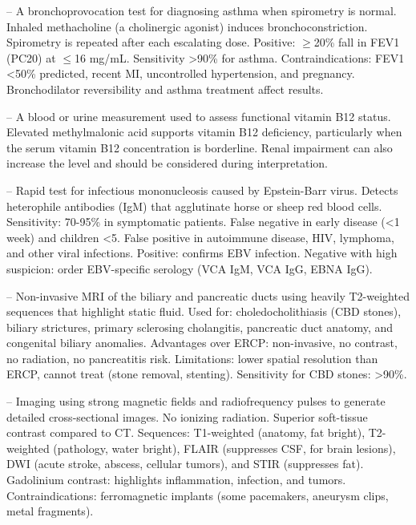 -- A bronchoprovocation test for diagnosing asthma when spirometry is normal. Inhaled methacholine (a cholinergic agonist) induces bronchoconstriction. Spirometry is repeated after each escalating dose. Positive: \(\ge\)20\% fall in FEV1 (PC20) at \(\le\)16 mg/mL. Sensitivity >90\% for asthma. Contraindications: FEV1 <50\% predicted, recent MI, uncontrolled hypertension, and pregnancy. Bronchodilator reversibility and asthma treatment affect results.

-- A blood or urine measurement used to assess functional vitamin B12 status. Elevated methylmalonic acid supports vitamin B12 deficiency, particularly when the serum vitamin B12 concentration is borderline. Renal impairment can also increase the level and should be considered during interpretation.

-- Rapid test for infectious mononucleosis caused by Epstein-Barr virus. Detects heterophile antibodies (IgM) that agglutinate horse or sheep red blood cells. Sensitivity: 70-95\% in symptomatic patients. False negative in early disease (<1 week) and children <5. False positive in autoimmune disease, HIV, lymphoma, and other viral infections. Positive: confirms EBV infection. Negative with high suspicion: order EBV-specific serology (VCA IgM, VCA IgG, EBNA IgG).

-- Non-invasive MRI of the biliary and pancreatic ducts using heavily T2-weighted sequences that highlight static fluid. Used for: choledocholithiasis (CBD stones), biliary strictures, primary sclerosing cholangitis, pancreatic duct anatomy, and congenital biliary anomalies. Advantages over ERCP: non-invasive, no contrast, no radiation, no pancreatitis risk. Limitations: lower spatial resolution than ERCP, cannot treat (stone removal, stenting). Sensitivity for CBD stones: >90\%.

-- Imaging using strong magnetic fields and radiofrequency pulses to generate detailed cross-sectional images. No ionizing radiation. Superior soft-tissue contrast compared to CT. Sequences: T1-weighted (anatomy, fat bright), T2-weighted (pathology, water bright), FLAIR (suppresses CSF, for brain lesions), DWI (acute stroke, abscess, cellular tumors), and STIR (suppresses fat). Gadolinium contrast: highlights inflammation, infection, and tumors. Contraindications: ferromagnetic implants (some pacemakers, aneurysm clips, metal fragments).

